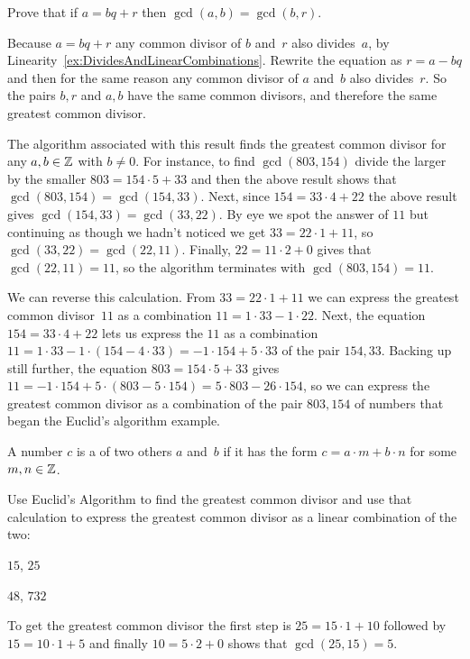 \documentclass{ibl}  %
\begin{document}
\begin{bezoutproof}
\begin{ex}
Prove that if $a=bq+r$ then $\gcd(a,b)=\gcd(b,r)$.  
\begin{ans}
Because $a=bq+r$ any common divisor of $b$ and~$r$ also divides~$a$, 
by Linearity~\ref{ex:DividesAndLinearCombinations}.
Rewrite the equation as $r=a-bq$ and then for the same reason any
common divisor of $a$ and~$b$ also divides~$r$.
So the pairs $b,r$ and $a,b$ have the same common divisors, and
therefore the same greatest common divisor.
\end{ans}
\end{ex}

The algorithm associated with this result finds the greatest common
divisor for any $a,b\in\mathbb{Z}$ with $b\neq 0$.  
For instance, to find $\gcd(803,154)$ divide the larger by
the smaller $803=154\cdot 5+33$ and then the above result shows that  
$\gcd(803,154)=\gcd(154,33)$.
Next, since $154=33\cdot 4+22$ the above result gives
$\gcd(154,33)=\gcd(33,22)$.
By eye we spot the answer of $11$ but continuing as though we hadn't noticed
we get $33=22\cdot 1+11$, so $\gcd(33,22)=\gcd(22,11)$.
Finally, $22=11\cdot 2+0$ gives that 
$\gcd(22,11)=11$, so the algorithm terminates with $\gcd(803,154)=11$.

We can reverse this calculation.
From $33=22\cdot 1+11$ we can  
express the greatest common divisor~$11$ as a combination 
$11=1\cdot 33-1\cdot 22$.
Next, 
the equation $154=33\cdot 4+22$ lets us express
the $11$ as a combination 
$11=1\cdot 33-1\cdot (154-4\cdot 33)=-1\cdot 154+5\cdot 33$
of the pair $154,33$.
Backing up still further, the equation 
$803=154\cdot 5+33$
gives $11=-1\cdot 154+5\cdot (803-5\cdot 154)=5\cdot 803-26\cdot 154$, so 
we can express the greatest common divisor as a combination of the pair
$803,154$ of numbers that began the Euclid's algorithm example.


\begin{df}
A number $c$ is a  of two others $a$ and~$b$
if it has the form $c=a\cdot m+b\cdot n$ for some $m,n\in\mathbb{Z}$.  
\end{df}

\begin{ex}
Use Euclid's Algorithm to find the greatest common divisor and 
use that calculation to express the greatest common divisor as a 
linear combination of the two:
\begin{items}
\item $15$, $25$
\item $48$, $732$
\end{items}
\begin{ans}
\begin{items}
\item To get the greatest common divisor the first step is
  $25=15\cdot 1+10$ followed by $15=10\cdot 1+5$ and finally
  $10=5\cdot 2+0$ shows that $\gcd(25,15)=5$.


\end{items}
\end{ans}
\end{ex}
\end{bezoutproof}
\end{document}

